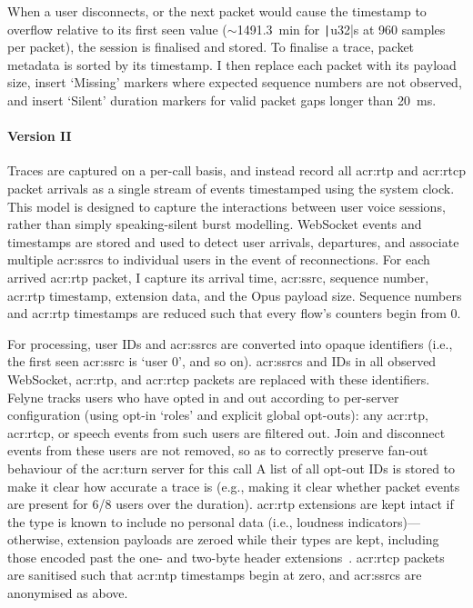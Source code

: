 When a user disconnects, or the next packet would cause the timestamp to overflow relative to its first seen value ($\sim$\qty{1491.3}{\minute} for \texttt|u32|s at \num{960} samples per packet), the session is finalised and stored.
To finalise a trace, packet metadata is sorted by its timestamp.
I then replace each packet with its payload size, insert `Missing' markers where expected sequence numbers are not observed, and insert `Silent' duration markers for valid packet gaps longer than \qty{20}{\milli\second}.

\paragraph{Version \RN{2}}
Traces are captured on a per-call basis, and instead record all \gls{acr:rtp} and \gls{acr:rtcp} packet arrivals as a single stream of events timestamped using the system clock.
This model is designed to capture the interactions between user voice sessions, rather than simply speaking-silent burst modelling.
WebSocket events and timestamps are stored and used to detect user arrivals, departures, and associate multiple \glspl{acr:ssrc} to individual users in the event of reconnections.
For each arrived \gls{acr:rtp} packet, I capture its arrival time, \gls{acr:ssrc}, sequence number, \gls{acr:rtp} timestamp, extension data, and the Opus payload size.
Sequence numbers and \gls{acr:rtp} timestamps are reduced such that every flow's counters begin from 0.

For processing, user IDs and \glspl{acr:ssrc} are converted into opaque identifiers (i.e., the first seen \gls{acr:ssrc} is `user 0', and so on).
\glspl{acr:ssrc} and IDs in all observed WebSocket, \gls{acr:rtp}, and \gls{acr:rtcp} packets are replaced with these identifiers.
Felyne tracks users who have opted in and out according to per-server configuration (using opt-in `roles' and explicit global opt-outs): any \gls{acr:rtp}, \gls{acr:rtcp}, or speech events from such users are filtered out.
Join and disconnect events from these users are not removed, so as to correctly preserve fan-out behaviour of the \gls{acr:turn} server for this call
A list of all opt-out IDs is stored to make it clear how accurate a trace is (e.g., making it clear whether packet events are present for 6/8 users over the duration).
\gls{acr:rtp} extensions are kept intact if the type is known to include no personal data (i.e., loudness indicators)---otherwise, extension payloads are zeroed while their types are kept, including those encoded past the one- and two-byte header extensions~\parencite{rfc8285}.
\gls{acr:rtcp} packets are sanitised such that \gls{acr:ntp} timestamps begin at zero, and \glspl{acr:ssrc} are anonymised as above.

